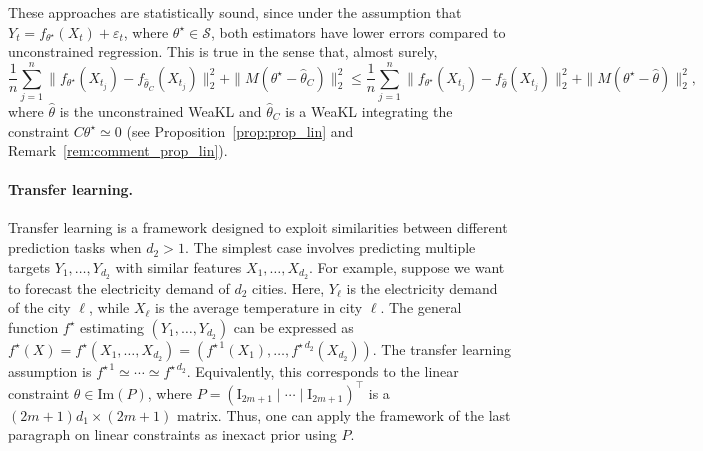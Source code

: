 These approaches are statistically sound, since under the assumption that $Y_t = f_{\theta^\star}(X_t)+ \varepsilon_t$, where $\theta^\star \in \mathcal{S}$, both estimators have lower errors compared to unconstrained regression. This is true in the sense that, almost surely,
\[\frac{1}{n}\sum_{j=1}^n\| f_{\theta^\star}(X_{t_j}) - f_{\hat \theta_C}(X_{t_j})\|_2^2 + \|M(\theta^\star- \hat \theta_C)\|_2^2\leq \frac{1}{n}\sum_{j=1}^n\| f_{\theta^\star}(X_{t_j}) - f_{\hat \theta}(X_{t_j})\|_2^2 + \|M(\theta^\star- \hat \theta)\|_2^2,\]
where $\hat \theta$ is the unconstrained WeaKL and $\hat \theta_C$ is a WeaKL integrating the constraint $C\theta^\star \simeq 0$ (see Proposition~\ref{prop:prop_lin} and Remark~\ref{rem:comment_prop_lin}).

\paragraph{Transfer learning.} Transfer learning is a framework designed to exploit similarities between different prediction tasks when $d_2 >1$. The simplest case involves predicting multiple targets $Y_1, \hdots, Y_{d_2}$ with similar features $X_1, \hdots, X_{d_2}$.
For example, suppose we want to forecast the electricity demand of $d_2$ cities. Here, $Y_\ell$ is the electricity demand of the city $\ell$, while $X_\ell$ is the average temperature in city $\ell$.
The general function $f^\star$ estimating $(Y_1, \hdots, Y_{d_2})$ can be expressed as $f^\star(X) = f^\star(X_1, \hdots, X_{d_2}) = (f^{\star\,1}(X_1), \hdots, f^{\star\,d_2}(X_{d_2}))$. The transfer learning assumption is $f^{\star\,1} \simeq \cdots \simeq f^{\star\,d_2}$. 
Equivalently, this corresponds to the linear constraint $\theta \in \mathrm{Im}(P)$, where $P = (\mathrm{I}_{2m+1} \mid \cdots \mid \mathrm{I}_{2m+1})^\top$ is a $(2m+1)d_1\times (2m+1)$ matrix. 
Thus, one can apply the framework of the last paragraph on linear constraints as inexact prior using $P$.



